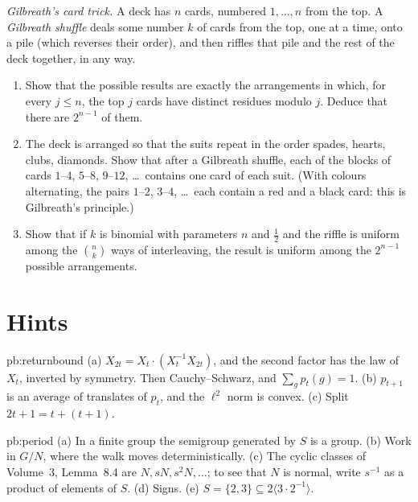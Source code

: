 \begin{exercise}[$\star\star$]\label{pb:gilbreath}
\emph{Gilbreath's card trick.} A deck has $n$ cards, numbered $1,\dots,n$ from the top. A \emph{Gilbreath shuffle} deals some number $k$ of cards from
the top, one at a time, onto a pile (which reverses their order), and then riffles that pile and the rest of the deck together, in
any way.
\begin{enumerate}[label=(\alph*)]
\item Show that the possible results are exactly the arrangements in which, for every $j\le n$, the top $j$ cards have distinct residues
modulo $j$. Deduce that there are $2^{n-1}$ of them.
\item The deck is arranged so that the suits repeat in the order spades, hearts, clubs, diamonds. Show that after a Gilbreath
shuffle, each of the blocks of cards $1$--$4$, $5$--$8$, $9$--$12$, \dots\ contains one card of each suit. (With colours alternating, the pairs
$1$--$2$, $3$--$4$, \dots\ each contain a red and a black card: this is Gilbreath's principle.)
\item Show that if $k$ is binomial with parameters $n$ and $\frac12$ and the riffle is uniform among the $\binom nk$ ways of interleaving, the result is
uniform among the $2^{n-1}$ possible arrangements.
\end{enumerate}
\end{exercise}

\section{Hints}

\begin{hint}{pb:returnbound}
(a) $X_{2t}=X_t\cdot(X_t^{-1}X_{2t})$, and the second factor has the law of $X_t$, inverted by symmetry. Then Cauchy--Schwarz, and $\sum_gp_t(g)=1$. (b) $p_{t+1}$ is
an average of translates of $p_t$, and the $\ell^2$ norm is convex. (c) Split $2t+1=t+(t+1)$.
\end{hint}

\begin{hint}{pb:period}
(a) In a finite group the semigroup generated by $S$ is a group. (b) Work in $G/N$, where the walk moves deterministically. (c) The cyclic classes of
Volume~3, Lemma~8.4 are $N,sN,s^2N,\dots$; to see that $N$ is normal, write $s^{-1}$ as a product of elements of $S$. (d) Signs. (e) $S=\{2,3\}\subseteq2\langle3\cdot2^{-1}\rangle$.
\end{hint}

